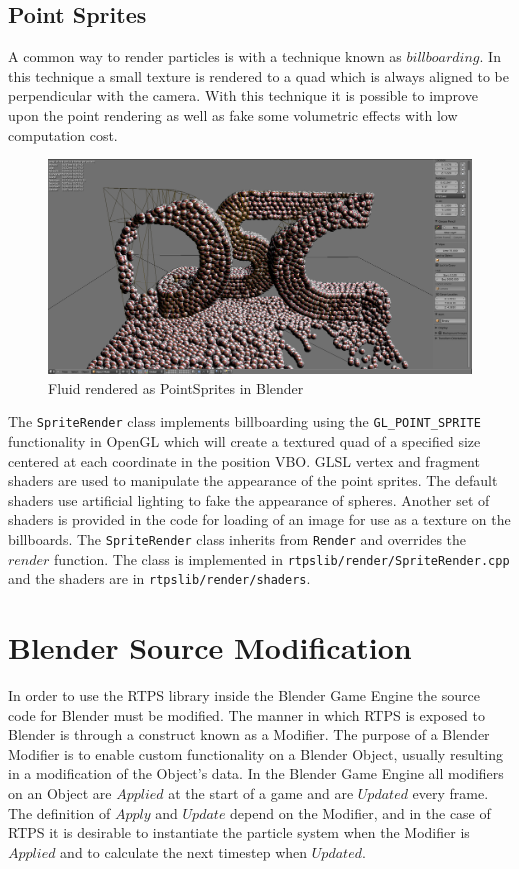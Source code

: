 \subsection{Point Sprites}
A common way to render particles is with a technique known as $billboarding$.
In this technique a small texture is rendered to a quad which is always aligned
to be perpendicular with the camera. With this technique it is possible to
improve upon the point rendering as well as fake some volumetric effects with
low computation cost.

\begin{figure}[!htc]
 		\centering
		\includegraphics[scale=0.2]{figures/pointsprites.png}
        \caption{ Fluid rendered as PointSprites in Blender }
		\label{fig:pointsprites}
\end{figure}


The \verb|SpriteRender| class implements billboarding using the
\verb|GL_POINT_SPRITE| functionality in OpenGL which will create a textured quad
of a specified size centered at each coordinate in the position VBO. GLSL
vertex and fragment shaders are used to manipulate the appearance of the point
sprites. The default shaders use artificial lighting to fake the appearance of
spheres. Another set of shaders is provided in the code for loading of an image
for use as a texture on the billboards. The \verb|SpriteRender| class inherits
from \verb|Render| and overrides the $render$ function. The class is
implemented in \verb|rtpslib/render/SpriteRender.cpp| and the shaders are in
\verb|rtpslib/render/shaders|.


\section{Blender Source Modification}

In order to use the RTPS library inside the Blender Game Engine the source code
for Blender must be modified. The manner in which RTPS is exposed to Blender is
through a construct known as a Modifier. The purpose of a Blender Modifier is
to enable custom functionality on a Blender Object, usually resulting in a
modification of the Object's data. In the Blender Game Engine all modifiers on an Object are
$Applied$ at the start of a game and are $Updated$ every frame. The definition
of $Apply$ and $Update$ depend on the Modifier, and in the case of RTPS it is
desirable to instantiate the particle system when the Modifier is $Applied$ and
to calculate the next timestep when $Updated$.


